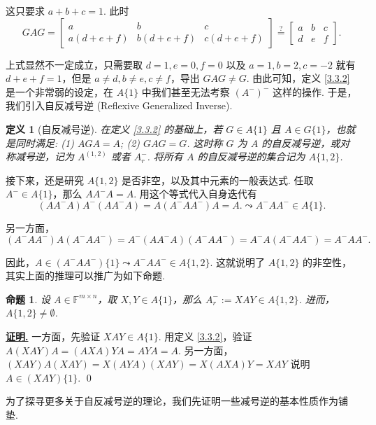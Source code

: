 \documentclass[10pt,openany]{article}
\theoremstyle{thmstyle} %
\theoremstyle{defstyle} %
\newtheorem{definition}[theorem]{定义}
\theoremstyle{prostyle} %
\newtheorem{proposition}[theorem]{命题}
\theoremstyle{exastyle}
\theoremstyle{remstyle}
\renewenvironment{proof}[1][证明]{\par\underline{\textbf{#1.}} \;\fangsong}{\qed\par}
\newcommand{\F}{\mathbb{F}}
\newcommand{\mn}{^{m \times n}}
\begin{document}
这只要求 \( a+b+c=1 \). 此时
\[ GAG=\begin{bmatrix}
	a & b & c \\
	a(d+e+f) & b(d+e+f) & c(d+e+f)
\end{bmatrix} \overset{?}{=} \begin{bmatrix}
a & b & c \\
d & e & f
\end{bmatrix}. \]

上式显然不一定成立，只需要取 \( d=1,e=0,f=0 \) 以及 \( a=1,b=2,c=-2 \) 就有 \( d+e+f=1 \)，但是 \( a \neq d, b \neq e, c \neq f \)，导出 \( GAG \neq G \). 由此可知，定义 \ref{3.3.2} 是一个非常弱的设定，在 \( A\{1\} \) 中我们甚至无法考察 \((A^{-})^{-} \) 这样的操作. 于是，我们引入自反减号逆 (Reflexive Generalized Inverse).

\begin{definition}[自反减号逆] \label{3.3.5}
	在定义 \ref{3.3.2} 的基础上，若 \( G \in A\{1\} \) 且 \( A \in G\{1\} \)，也就是同时满足: (1) \( AGA=A \); (2) \( GAG=G \). 这时称 \( G \) 为 \( A \) 的自反减号逆，或对称减号逆，记为 \( A^{(1,2)} \) 或者 \( A_r^{-} \). 将所有 \( A \) 的自反减号逆的集合记为 \( A\{1,2\} \).
\end{definition}


接下来，还是研究 \( A\{1,2\} \) 是否非空，以及其中元素的一般表达式. 任取 \( A^{-} \in A\{1\} \)，那么 \( AA^{-}A=A \). 用这个等式代入自身迭代有
\[ (AA^{-}A)A^{-}(AA^{-}A)=A(A^{-}AA^{-})A=A. \leadsto A^{-}AA^{-} \in A\{1\}. \]

另一方面，
\[ (A^{-}AA^{-})A(A^{-}AA^{-})=A^{-}(AA^{-}A)(A^{-}AA^{-})=A^{-}A(A^{-}AA^{-})=A^{-}AA^{-}. \]

因此，\( A \in (A^{-}AA^{-})\{1\} \leadsto A^{-}AA^{-} \in A\{1,2\} \). 这就说明了 \( A\{1,2\} \) 的非空性，其实上面的推理可以推广为如下命题.

\begin{proposition}
	设 \( A \in \F\mn \)，取 \( X,Y \in A\{1\} \)，那么 \( A_r^{-}:=XAY \in A\{1,2\} \). 进而，\( A\{1,2\} \neq  \emptyset \). 
\end{proposition}

\begin{proof}
	一方面，先验证 \( XAY \in A\{1\} \). 用定义 \ref{3.3.2}，验证 \( A(XAY)A=(AXA)YA=AYA=A \). 另一方面，\( (XAY)A(XAY)=X(AYA)(XAY)=X(AXA)Y=XAY  \) 说明 \( A \in (XAY)\{1\} \).
\end{proof}

为了探寻更多关于自反减号逆的理论，我们先证明一些减号逆的基本性质作为铺垫.
\end{document}
